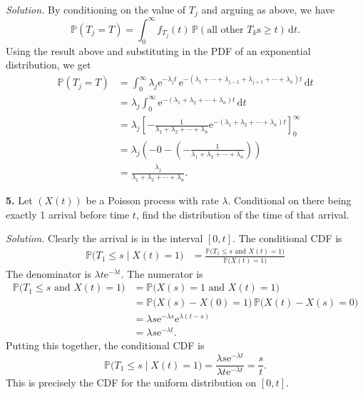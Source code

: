 \documentclass[
  a4paper,
]{article}
\theoremstyle{definition}
\theoremstyle{definition}
\theoremstyle{definition}
\theoremstyle{remark}
\begin{document}
\begin{myanswers}
\emph{Solution.}
By conditioning on the value of \(T_j\) and arguing as above, we have
\[ \mathbb P(T_j = T) = \int_0^\infty f_{T_j}(t) \, \mathbb P(\text{all other $T_k$s} \geq t) \, \mathrm dt .  \]
Using the result above and substituting in the PDF of an exponential distribution, we get
\begin{align*} \mathbb P(T_j = T) &= \int_0^\infty \lambda_j \mathrm{e}^{-\lambda_j t}\, \mathrm{e}^{-(\lambda_1 + \cdots + \lambda_{j-1} + \lambda_{j+1} + \cdots + \lambda_n)t} \, \mathrm dt \\         
&= \lambda_j \int_0^\infty \mathrm{e}^{-(\lambda_1 + \lambda_2 + \cdots + \lambda_n) t} \, \mathrm dt \\
&= \lambda_j \left[ -\frac{1}{\lambda_1 + \lambda_2 + \cdots + \lambda_n} \mathrm{e}^{-(\lambda_1 + \lambda_2 + \cdots + \lambda_n) t} \right]_0^\infty \\
&= \lambda_j \left(-0 - \left(- \frac{1}{\lambda_1 + \lambda_2 + \cdots + \lambda_n}\right)\right) \\
&= \frac{\lambda_j}{\lambda_1 + \lambda_2 + \cdots + \lambda_n} . \end{align*}

\end{myanswers}

\textbf{5.}
Let \((X(t))\) be a Poisson process with rate \(\lambda\). Conditional on there being exactly 1 arrival before time \(t\), find the distribution of the time of that arrival.

\begin{myanswers}
\emph{Solution.}
Clearly the arrival is in the interval \([0,t]\). The conditional CDF is
\begin{align*}
  \mathbb P\big(T_1 \leq s \mid X(t) = 1\big)
    &= \frac{\mathbb P\big( T_1 \leq s \text{ and } X(t) = 1 \big)}{\mathbb P\big(X(t) = 1 \big)} %
\end{align*}
The denominator is \(\lambda t \mathrm{e}^{-\lambda t}\). The numerator is
\begin{align*}
\mathbb P\big( T_1 \leq s \text{ and } X(t) = 1 \big)
  &= \mathbb P\big(X(s) = 1 \text{ and } X(t) = 1 \big) \\
  &= \mathbb P \big(X(s)-X(0) = 1\big) \, \mathbb P\big(X(t) - X(s) = 0\big) \\
  &= \lambda s \mathrm{e}^{-\lambda s} \mathrm{e}^{\lambda(t-s)} \\
  &= \lambda s \mathrm{e}^{-\lambda t} .
\end{align*}
Putting this together, the conditional CDF is
\[ \mathbb P\big(T_1 \leq s \mid X(t) = 1\big) = \frac{\lambda s \mathrm{e}^{-\lambda t}}{\lambda t \mathrm{e}^{-\lambda t}} = \frac{s}{t} .   \]
This is precisely the CDF for the uniform distribution on \([0,t]\).

\end{myanswers}
\end{document}
